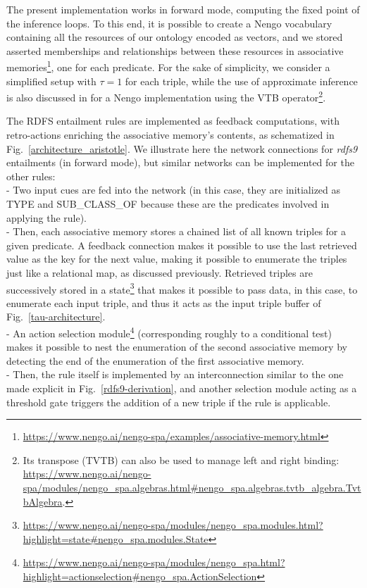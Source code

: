 \documentclass[sn-mathphys]{sn-jnl}
\begin{document}
The present implementation works in forward mode, computing the fixed point of the inference loops. To this end, it is possible to create a Nengo vocabulary containing all the resources of our ontology encoded as vectors, and we stored asserted memberships and relationships between these resources in associative memories\footnote{\url{https://www.nengo.ai/nengo-spa/examples/associative-memory.html}}, one for each predicate. For the sake of simplicity, we consider a simplified setup with $\tau = 1$ for each triple, while the use of approximate inference is also discussed in \cite{mercier_ontology_2021} for a Nengo implementation using the VTB operator\footnote{Its transpose (TVTB) can also be used to manage left and right binding: \url{https://www.nengo.ai/nengo-spa/modules/nengo_spa.algebras.html\#nengo_spa.algebras.tvtb_algebra.TvtbAlgebra}.}.

The RDFS entailment rules are implemented as feedback computations, with retro-actions enriching the associative memory's contents, as schematized in Fig.~\ref{architecture_aristotle}. We illustrate here the network connections for \textit{rdfs9} entailments (in forward mode), but similar networks can be implemented for the other rules: 
\\- Two input cues are fed into the network (in this case, they are initialized as TYPE and SUB\_CLASS\_OF because these are the predicates involved in applying the rule). 
\\- Then, each associative memory stores a chained list of all known triples for a given predicate. A feedback connection makes it possible to use the last retrieved value as the key for the next value, making it possible to enumerate the triples just like a relational map, as discussed previously. Retrieved triples are successively stored in a state\footnote{\url{https://www.nengo.ai/nengo-spa/modules/nengo_spa.modules.html?highlight=state\#nengo_spa.modules.State}} that makes it possible to pass data, in this case, to enumerate each input triple, and thus it acts as the input triple buffer of Fig.~\ref{tau-architecture}.
\\ - An action selection module\footnote{\url{https://www.nengo.ai/nengo-spa/modules/nengo_spa.html?highlight=actionselection\#nengo_spa.ActionSelection}} (corresponding roughly to a conditional test) makes it possible to nest the enumeration of the second associative memory by detecting the end of the enumeration of the first associative memory.
\\ - Then, the rule itself is implemented by an interconnection similar to the one made explicit in Fig.~\ref{rdfs9-derivation}, and another selection module acting as a threshold gate triggers the addition of a new triple if the rule is applicable.
\end{document}
